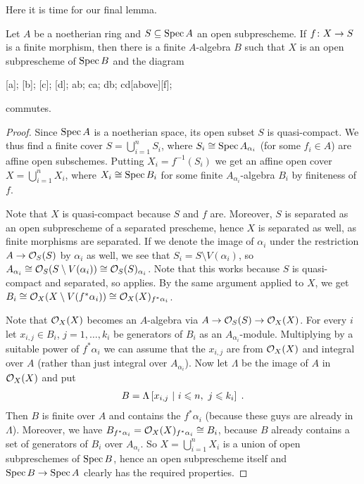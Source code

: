 \documentclass[a4paper,parskip=half,numbers=enddot, DIV=12]{scrreprt}
\renewcommand{\leq}{\leqslant}
\begin{document}
Here it is time for our final lemma.
\begin{lem}
	Let $A$ be a noetherian ring and $S\subseteq \operatorname{Spec} A$ an open subprescheme. If $f\colon X\morphism S$ is a finite morphism, then there is a finite $A$-algebra $B$ such that $X$ is an open subprescheme of $\operatorname{Spec} B$ and the diagram
	\begin{diagram*}
		[a];
		[b];
		[c];
		[d];
		\scriptsize
		\arrow ab;
		 ca;
		 db;
		\arrow cd[above][f];
	\end{diagram*}
	commutes.
\end{lem}
\begin{proof}
	Since $\operatorname{Spec} A$ is a noetherian space, its open subset $S$ is quasi-compact. We thus find a finite cover $S=\bigcup_{i=1}^n S_i$, where $S_i\cong \operatorname{Spec} A_{\alpha_i}$ (for some $f_i\in A$) are affine open subschemes. Putting $X_i=f^{-1}(S_i)$ we get an affine open cover $X=\bigcup_{i=1}^nX_i$, where $X_i\cong \operatorname{Spec} B_i$ for some finite $A_{\alpha_i}$-algebra $B_i$ by finiteness of $f$.
	
	Note that $X$ is quasi-compact because $S$ and $f$ are. Moreover, $S$ is separated as an open subprescheme of a separated prescheme, hence $X$ is separated as well, as finite morphisms are separated. If we denote the image of $\alpha_i$ under the restriction $A\morphism \Oo_S(S)$ by $\alpha_i$ as well, we see that $S_i=S\setminus V(\alpha_i)$, so $A_{\alpha_i}\cong \mathcal{O}_S(S\setminus V(\alpha_i))\cong \mathcal{O}_S(S)_{\alpha_i}$. Note that this works because $S$ is quasi-compact and separated, so \cite[Proposition~1.5.1]{alggeo1} applies. By the same argument applied to $X$, we get $B_i\cong \mathcal{O}_X(X\setminus V(f^*\alpha_i))\cong \mathcal{O}_X(X)_{f^*\alpha_i}$.
	
	Note that $\mathcal{O}_X(X)$ becomes an $A$-algebra via $A\morphism \Oo_S(S)\morphism \Oo_X(X)$. For every $i$ let $x_{i,j}\in B_i$, $j=1,\ldots,k_i$ be generators of $B_i$ as an $A_{\alpha_i}$-module. Multiplying by a suitable power of $f^*\alpha_i$ we can assume that the $x_{i,j}$ are from $\mathcal{O}_X(X)$ and integral over $A$ (rather than just integral over $A_{\alpha_i}$). Now let $\Lambda$ be the image of $A$ in $\mathcal{O}_X(X)$ and put
	\begin{align*}
		B=\Lambda\left[x_{i,j}\st i\leq n,\ j\leq k_i\right]\;.
	\end{align*}
	Then $B$ is finite over $A$ and contains the $f^*\alpha_i$ (because these guys are already in $\Lambda$). Moreover, we have $B_{f^*\alpha_i}=\mathcal{O}_X(X)_{f^*\alpha_i}\cong B_i$, because $B$ already contains a set of generators of $B_i$ over $A_{\alpha_i}$. So $X=\bigcup_{i=1}^nX_i$ is a union of open subpreschemes of $\operatorname{Spec} B$, hence an open subprescheme itself and $\Spec B\morphism \Spec A$ clearly has the required properties.
\end{proof}
\end{document}
